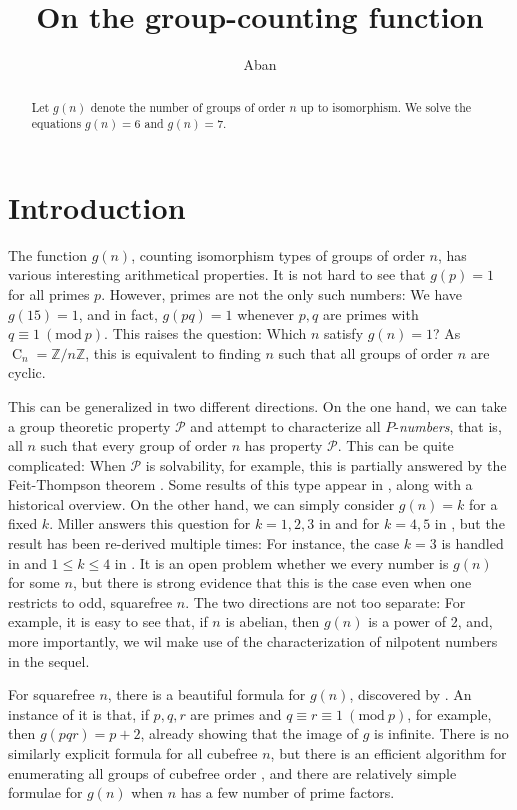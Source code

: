 \documentclass[draft]{article}
\newcommand{\cyc}[1]{\operatorname{C}_{#1}}
\newcommand{\Mod}[1]{\ (\mathrm{mod} \ #1)}
\theoremstyle{plain}
\theoremstyle{definition}
\begin{document}
\title{On the group-counting function}
\author{Aban}
\maketitle

\begin{abstract}
	Let $g(n)$ denote the number of groups of order $n$ up to isomorphism. We solve the equations $g(n) = 6$ and $g(n) = 7$.
\end{abstract}

\section{Introduction}
The function $g(n)$, counting isomorphism types of groups of order $n$, has various interesting arithmetical properties. It is not hard to see that $g(p) = 1$ for all primes $p$. However, primes are not the only such numbers: We have $g(15) = 1$, and in fact, $g(pq) = 1$ whenever $p, q$ are primes with $q \equiv 1 \Mod{p}$. This raises the question: Which $n$ satisfy $g(n) = 1$? As $\cyc{n} = \mathbb{Z}/n\mathbb{Z}$, this is equivalent to finding $n$ such that all groups of order $n$ are cyclic.

This can be generalized in two different directions. On the one hand, we can take a group theoretic property $\mathcal{P}$ and attempt to characterize all $P$-\emph{numbers}, that is, all $n$ such that every group of order $n$ has property $\mathcal{P}$. This can be quite complicated: When $\mathcal{P}$ is solvability, for example, this is partially answered by the Feit-Thompson theorem {\cite{oddsolve}}. Some results of this type appear in {{\cite{nilnumb}}}, along with a historical overview. On the other hand, we can simply consider $g(n) = k$ for a fixed $k$. Miller answers this question for $k = 1, 2, 3$ in {\cite{miller1}} and for $k = 4, 5$ in {\cite{miller2}}, but the result has been re-derived multiple times: For instance, the case $k = 3$ is handled in {\cite{olsson}} and $1 \le k \le 4$ in {\cite{gnumoas}}. It is an open problem whether we every number is $g(n)$ for some $n$, but there is strong evidence that this is the case even when one restricts to odd, squarefree $n$. The two directions are not too separate: For example, it is easy to see that, if $n$ is abelian, then $g(n)$ is a power of 2, and, more importantly, we wil make use of the characterization of nilpotent numbers in the sequel.

For squarefree $n$, there is a beautiful formula for $g(n)$, discovered by . An instance of it is that, if $p, q, r$ are primes and $q \equiv r \equiv 1 \Mod{p}$, for example, then $g(pqr) = p + 2$, already showing that the image of $g$ is infinite. There is no similarly explicit formula for all cubefree $n$, but there is an efficient algorithm for enumerating all groups of cubefree order {\cite{cubefree}}, and there are relatively simple formulae for $g(n)$ when $n$ has a few number of prime factors.
\end{document}
